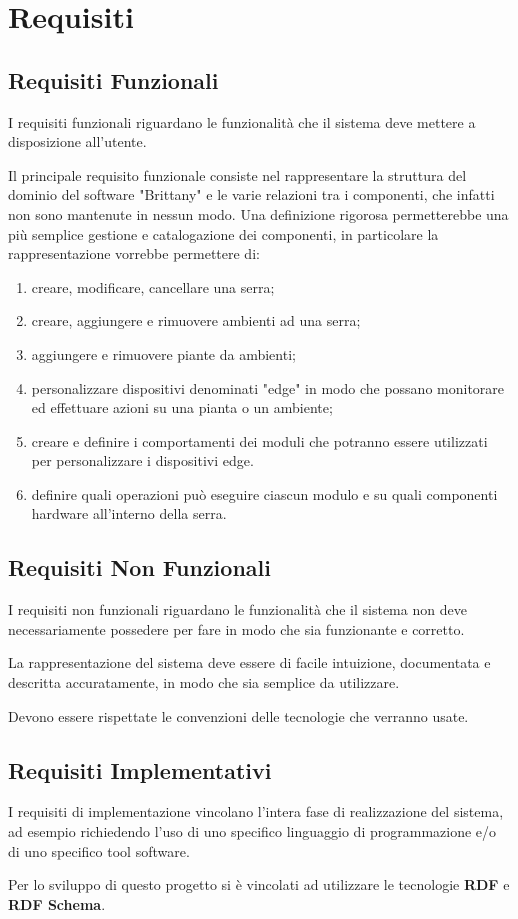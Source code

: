\section{Requisiti}

\subsection{Requisiti Funzionali}

I requisiti funzionali riguardano le funzionalità che il sistema deve mettere a disposizione all’utente.

\noindent Il principale requisito funzionale consiste nel rappresentare la struttura del dominio del software "Brittany" e le varie relazioni tra i componenti, che infatti non sono mantenute in nessun modo. Una definizione rigorosa permetterebbe una più semplice gestione e catalogazione dei componenti, in particolare la rappresentazione vorrebbe permettere di:
\begin{enumerate}
	\item creare, modificare, cancellare una serra;
	\item creare, aggiungere e rimuovere ambienti ad una serra;
	\item aggiungere e rimuovere piante da ambienti;
	\item personalizzare dispositivi denominati "edge" in modo che possano monitorare ed effettuare azioni su una pianta o un ambiente;
	\item creare e definire i comportamenti dei moduli che potranno essere utilizzati per personalizzare i dispositivi edge.
	\item definire quali operazioni può eseguire ciascun modulo e su quali componenti hardware all'interno della serra.
\end{enumerate}

\subsection{Requisiti Non Funzionali}
I requisiti non funzionali riguardano le funzionalità che il sistema non deve necessariamente possedere per fare in modo che sia funzionante e corretto.\newline

\noindent La rappresentazione del sistema deve essere di facile intuizione, documentata e descritta accuratamente, in modo che sia semplice da utilizzare.\newline

\noindent Devono essere rispettate le convenzioni delle tecnologie che verranno usate.

\subsection{Requisiti Implementativi}

I requisiti di implementazione vincolano l’intera fase di realizzazione del sistema, ad esempio richiedendo l’uso di uno specifico linguaggio di programmazione e/o di uno specifico tool software.

\noindent Per lo sviluppo di questo progetto si è vincolati ad utilizzare le tecnologie \textbf{RDF} e \textbf{RDF Schema}.
